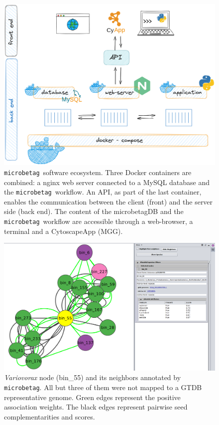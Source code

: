\documentclass[sn-mathphys,Numbered]{sn-jnl}  %
\theoremstyle{thmstyleone}%
\theoremstyle{thmstyletwo}%
\theoremstyle{thmstylethree}%
\newcommand{\microbetag}{\texttt{microbetag}}
\begin{document}
\begin{appendices}
        \begin{figure}[H]
            \includegraphics*[width=0.9\columnwidth]{figs/architecture.png}
            \caption{
                \microbetag~software ecosystem. 
                Three Docker containers are combined: 
                a nginx web server connected to a MySQL database and the \microbetag~workflow.
                An API, as part of the last container, enables the communication between the client (front) and the server side (back end).
                The content of the microbetagDB and the \microbetag~workflow are accessible through a web-browser, a terminal and a CytoscapeApp (MGG).
            }
        \label{fig:s1}
        \end{figure}
    
        \begin{figure}[H]
            \includegraphics*[width=0.9\columnwidth]{figs/node55Neigh.png}
            \caption{
                \textit{Variovorax} node (bin\_55) and its neighbors annotated by \microbetag. 
                All but three of them were not mapped to a GTDB representative genome. 
                Green edges represent the positive association weights. 
                The black edges represent pairwise seed complementarities and scores.
            }
            \label{fig:s2}
        \end{figure}
        


\end{appendices}
\end{document}
